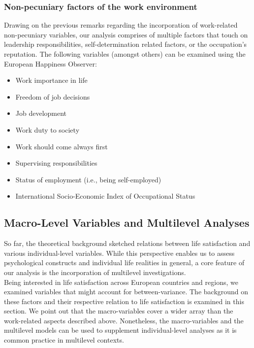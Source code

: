 \documentclass[preprint,12pt,authoryear]{elsarticle}
\begin{document}
\subsubsection{Non-pecuniary factors of the work environment}
Drawing on the previous remarks regarding the incorporation of work-related non-pecuniary variables, our analysis comprises of
multiple factors that touch on leadership responsibilities, self-determination related factors, or the occupation's reputation.
The following variables (amongst others) can be examined using the European Happiness Observer:
\begin{itemize}
   \item Work importance in life
   \item Freedom of job decisions
   \item Job development
   \item Work duty to society
   \item Work should come always first
   \item Supervising responsibilities 
   \item Status of employment (i.e., being self-employed)
   \item International Socio-Economic Index of Occupational Status   
\end{itemize}

\subsection{Macro-Level Variables and Multilevel Analyses}
So far, the theoretical background sketched relations between life satisfaction and various individual-level variables. While
this perspective enables us to assess psychological constructs and individual life realities in general, a core feature of our
analysis is the incorporation of multilevel investigations. \\
Being interested in life satisfaction across European countries and regions, we examined variables that might account for 
between-variance. The background on these factors and their respective relation to life satisfaction is examined in this 
section. We point out that the macro-variables cover a wider array than the work-related aspects described above. Nonetheless,
the macro-variables and the multilevel models can be used to supplement individual-level analyses as it is common practice
in multilevel contexts.
\end{document}
